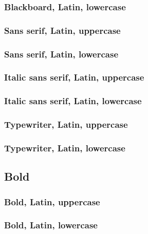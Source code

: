 \documentclass[final]{article}
\newcounter{#1}
\begin{document}
\subsubsection{Blackboard, Latin, lowercase}

\subsubsection{Sans serif, Latin, uppercase}

\subsubsection{Sans serif, Latin, lowercase}

\subsubsection{Italic sans serif, Latin, uppercase}

\subsubsection{Italic sans serif, Latin, lowercase}

\subsubsection{Typewriter, Latin, uppercase}

\subsubsection{Typewriter, Latin, lowercase}

\subsection{Bold}

\subsubsection{Bold, Latin, uppercase}

\subsubsection{Bold, Latin, lowercase}
\end{document}
